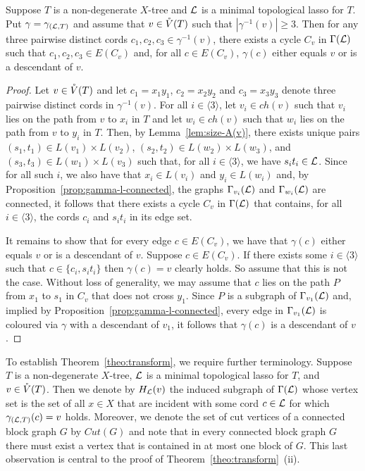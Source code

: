 \begin{lem}
  \label{lem:3-edges-cycle}
  Suppose $T$ is a non-degenerate $X$-tree and ${\mathcal L}$ is a minimal topological
  lasso for $T$.  Put $\gamma=\gamma_{({\mathcal L},T)}$ and assume that $v\in \mathring{V}(T)$
  such that $|\gamma^{-1}(v)|\geq 3 $. Then for any three pairwise distinct
  cords $c_1,c_2,c_3\in \gamma^{-1}(v)$, there exists a cycle $C_v$ in
  $\Gamma({\mathcal L})$ such that $c_1,c_2,c_3\in E(C_v)$ and, for all $c\in E(C_v)$,
  $\gamma(c)$ either equals $v$ or is a descendant of $v$.
\end{lem}
\begin{proof}
  Let $v\in \mathring{V}(T)$ and let $c_1=x_1y_1$, $c_2=x_2y_2$ and $c_3=x_3y_3$ denote
  three pairwise distinct cords in $\gamma^{-1}(v)$.  For all $i\in\langle
  3\rangle$, let $v_i\in ch(v) $ such that $v_i$ lies on the path from $v$ to
  $x_i$ in $T$ and let $w_i\in ch(v)$ such that $w_i$ lies on the path from
  $v$ to $y_i$ in $T$.  Then, by Lemma~\ref{lem:size-A(v)}, there exists
  unique pairs $(s_1,t_1)\in L(v_1)\times L(v_2)$, $(s_2,t_2)\in L(w_2)\times
  L(w_3)$, and $(s_3,t_3)\in L(w_1)\times L(v_3)$ such that, for all
  $i\in\langle 3\rangle$, we have $s_it_i\in {\mathcal L}$.  Since for all such $i$, we
  also have that $x_i\in L(v_i)$ and $y_i\in L(w_i)$ and, by
  Proposition~\ref{prop:gamma-l-connected}, the graphs $\Gamma_{v_i}({\mathcal L})$ and
  $\Gamma_{w_i}({\mathcal L})$ are connected, it follows that there exists a cycle
  $C_v$ in $\Gamma({\mathcal L})$ that contains, for all $i\in\langle 3\rangle$, the
  cords $c_i$ and $s_it_i$ in its edge set.

  It remains to show that for every edge $c\in E(C_v)$, we have that
  $\gamma(c)$ either equals $v$ or is a descendant of $v$.  Suppose $c\in
  E(C_v)$.  If there exists some $i\in\langle 3\rangle$ such that
  $c\in\{c_i,s_it_i\}$ then $\gamma (c)=v$ clearly holds. So assume that this
  is not the case. Without loss of generality, we may assume that $c$ lies on
  the path $P$ from $x_1$ to $s_1$ in $C_v$ that does not cross $y_1$. Since
  $P$ is a subgraph of $\Gamma_{v_1}({\mathcal L})$ and, implied by
  Proposition~\ref{prop:gamma-l-connected}, every edge in $\Gamma_{v_1}({\mathcal L})$
  is coloured via $\gamma$ with a descendant of $v_1$, it follows that
  $\gamma(c)$ is a descendant of $v$.
\end{proof}

To establish Theorem~\ref{theo:transform}, we require further terminology.
Suppose $T$ is a non-degenerate $X$-tree, ${\mathcal L}$ is a minimal topological lasso
for $T$, and $v\in \mathring{V}(T)$.  Then we denote by $H_{{\mathcal L}}(v)$ the induced
subgraph of $\Gamma({\mathcal L})$ whose vertex set is the set of all $x\in X$ that are
incident with some cord $c\in {\mathcal L}$ for which $\gamma_{({\mathcal L},T)}(c)=v$ holds.
Moreover, we denote the set of cut vertices of a connected block graph $G$ by
$Cut(G)$ and note that in every connected block graph $G$ there must exist a
vertex that is contained in at most one block of $G$. This last observation is
central to the proof of Theorem~\ref{theo:transform}~(ii).

